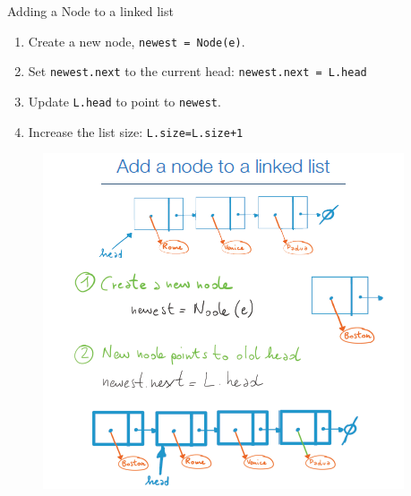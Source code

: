     
    Adding a Node to a linked list
    \begin{enumerate}
        \item Create a new node, \texttt{newest = Node(e)}.
        \item Set \texttt{newest.next} to the current head:  \texttt{newest.next = L.head}
        \item Update \texttt{L.head} to point to \texttt{newest}.
        \item Increase the list size: \texttt{L.size=L.size+1}
    \end{enumerate}
    \begin{figure}[h!]
        \centering
        \begin{minipage}{0.45\textwidth}
          \centering
          \includegraphics[width=\textwidth]{immagini/linkl1.png}
        \end{minipage}
        \hfill
        \begin{minipage}{0.45\textwidth}
          \centering

\end{minipage}
\end{figure}

